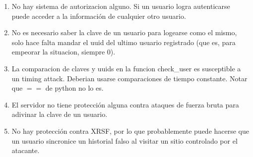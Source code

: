 \documentclass[11pt, a4paper, twoside]{article}
\begin{document}
\begin{enumerate}
\item No hay sistema de autorizacion alguno. Si un usuario logra autenticarse puede acceder a la información de cualquier otro usuario.

\item No es necesario saber la clave de un usuario para logearse como el mismo, solo hace falta mandar el uuid del ultimo usuario registrado (que es, para empeorar la situacion, siempre 0).

\item La comparacion de claves y uuids en la funcion check\_user es susceptible a un timing attack. Deberian usarse comparaciones de tiempo constante. Notar que $==$ de python no lo es.

\item El servidor no tiene protección alguna contra ataques de fuerza bruta para adivinar la clave de un usuario.

\item No hay protección contra XRSF, por lo que probablemente puede hacerse que un usuario sincronice un historial falso al visitar un sitio controlado por el atacante.

\end{enumerate}
\end{document}
